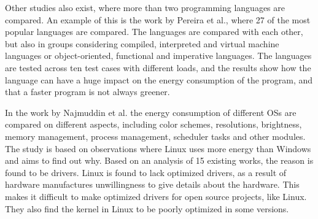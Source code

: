 Other studies also exist, where more than two programming languages are compared. An example of this is the work by Pereira et al.\cite[]{Pereira2017}, where 27 of the most popular languages are compared. The languages are compared with each other, but also in groups considering compiled, interpreted and virtual machine languages or object-oriented, functional and imperative languages. The languages are tested across ten test cases with different loads, and the results show how the language can have a huge impact on the energy consumption of the program, and that a faster program is not always greener.\newline

In the work by Najmuddin et al.\cite[]{Najmuddin2021} the energy consumption of different OSs are compared on different aspects, including color schemes, resolutions, brightness, memory management, process management, scheduler tasks and other modules. The study is based on observations where Linux uses more energy than Windows and aims to find out why. Based on an analysis of 15 existing works, the reason is found to be drivers. Linux is found to lack optimized drivers, as a result of hardware manufactures unwillingness to give details about the hardware. This makes it difficult to make optimized drivers for open source projects, like Linux. They also find the kernel in Linux to be poorly optimized in some versions.